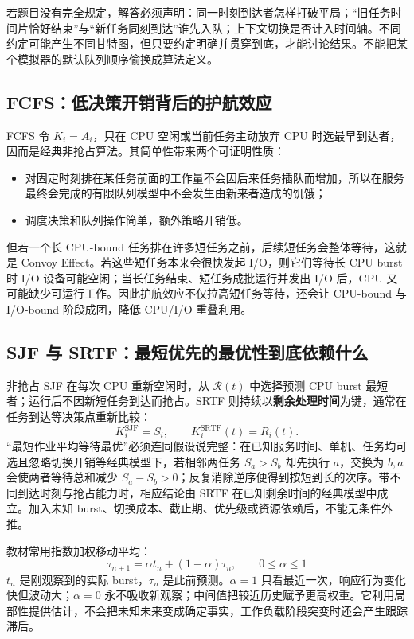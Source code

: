 \documentclass[11pt,a4paper]{ctexart}
\newcommand{\kw}[1]{\textbf{#1}}
\begin{document}
\begin{exam}[所有甘特图计算先声明三类约定]
若题目没有完全规定，解答必须声明：同一时刻到达者怎样打破平局；“旧任务时间片恰好结束”与“新任务同刻到达”谁先入队；上下文切换是否计入时间轴。不同约定可能产生不同甘特图，但只要约定明确并贯穿到底，才能讨论结果。不能把某个模拟器的默认队列顺序偷换成算法定义。
\end{exam}

\subsection{FCFS：低决策开销背后的护航效应}

FCFS 令 $K_i=A_i$，只在 CPU 空闲或当前任务主动放弃 CPU 时选最早到达者，因而是经典非抢占算法。其简单性带来两个可证明性质：
\begin{itemize}
\item 对固定时刻排在某任务前面的工作量不会因后来任务插队而增加，所以在服务最终会完成的有限队列模型中不会发生由新来者造成的饥饿；
\item 调度决策和队列操作简单，额外策略开销低。
\end{itemize}

但若一个长 CPU-bound 任务排在许多短任务之前，后续短任务会整体等待，这就是 Convoy Effect。若这些短任务本来会很快发起 I/O，则它们等待长 CPU burst 时 I/O 设备可能空闲；当长任务结束、短任务成批运行并发出 I/O 后，CPU 又可能缺少可运行工作。因此护航效应不仅拉高短任务等待，还会让 CPU-bound 与 I/O-bound 阶段成团，降低 CPU/I/O 重叠利用。

\subsection{SJF 与 SRTF：最短优先的最优性到底依赖什么}

非抢占 SJF 在每次 CPU 重新空闲时，从 $\mathcal R(t)$ 中选择预测 CPU burst 最短者；运行后不因新短任务到达而抢占。SRTF 则持续以\kw{剩余处理时间}为键，通常在任务到达等决策点重新比较：
\[
K_i^{\text{SJF}}=S_i,\qquad
K_i^{\text{SRTF}}(t)=R_i(t).
\]
“最短作业平均等待最优”必须连同假设说完整：在已知服务时间、单机、任务均可选且忽略切换开销等经典模型下，若相邻两任务 $S_a>S_b$ 却先执行 $a$，交换为 $b,a$ 会使两者等待总和减少 $S_a-S_b>0$；反复消除逆序便得到按短到长的次序。带不同到达时刻与抢占能力时，相应结论由 SRTF 在已知剩余时间的经典模型中成立。加入未知 burst、切换成本、截止期、优先级或资源依赖后，不能无条件外推。

\begin{method}
教材常用指数加权移动平均：
\[
\boxed{\tau_{n+1}=\alpha t_n+(1-\alpha)\tau_n,\qquad 0\le\alpha\le1}
\]
$t_n$ 是刚观察到的实际 burst，$\tau_n$ 是此前预测。$\alpha=1$ 只看最近一次，响应行为变化快但波动大；$\alpha=0$ 永不吸收新观察；中间值把较近历史赋予更高权重。它利用局部性提供估计，不会把未知未来变成确定事实，工作负载阶段突变时还会产生跟踪滞后。
\end{method}
\end{document}
